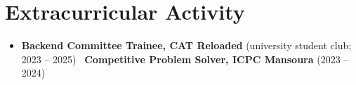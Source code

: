 \section{Extracurricular Activity}
\begin{itemize}[leftmargin=0.15in, label={}, itemsep=5pt, topsep=4pt]
  \small
  \item \textbf{Backend Committee Trainee, CAT Reloaded} (university student club; 2023 -- 2025) \textbar\ \textbf{Competitive Problem Solver, ICPC Mansoura} (2023 -- 2024)
\end{itemize}